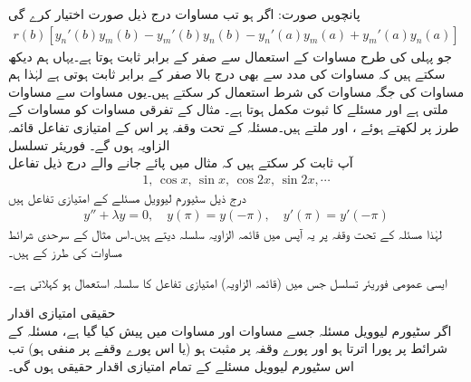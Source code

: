 پانچویں صورت: اگر  ہو تب مساوات   درج ذیل صورت اختیار کرے گی
\begin{align*}
r(b)[y_n'(b)y_m(b)-y_m'(b)y_n(b)-y_n'(a)y_m(a)+y_m'(a)y_n(a)]
\end{align*}
جو پہلی کی طرح  مساوات  کے استعمال سے صفر کے برابر ثابت ہوتا ہے۔یہاں ہم دیکھ سکتے ہیں کہ مساوات  کی مدد سے بھی درج بالا صفر کے برابر ثابت ہوتی ہے لہٰذا ہم مساوات  کی جگہ مساوات  کی شرط استعمال کر سکتے ہیں۔یوں مساوات  سے مساوات  ملتی ہے اور مسئلے کا ثبوت مکمل ہوتا ہے۔
مثال  کے تفرقی مساوات کو مساوات  کے طرز پر لکھتے ہوئے ،  اور  ملتے ہیں۔مسئلہ  کے تحت وقفہ  پر اس کے امتیازی تفاعل قائمہ الزاویہ ہوں گے۔
\quad فوریئر تسلسل\\
آپ ثابت کر سکتے ہیں کہ مثال  میں پائے جانے والے درج ذیل تفاعل 
\begin{align*}
1,\, \cos x , \, \sin x,\, \cos 2x,\, \sin 2x, \cdots
\end{align*}
درج ذیل سٹیورم لیوویل مسئلے کے امتیازی تفاعل ہیں
\begin{align*}
y''+\lambda y=0, \quad y(\pi)=y(-\pi), \quad y'(\pi)=y'(-\pi)
\end{align*}
 لہٰذا مسئلہ  کے تحت وقفہ  پر  یہ آپس میں قائمہ الزاویہ سلسلہ دیتے ہیں۔اس مثال کے سرحدی شرائط مساوات  کی طرز کے ہیں۔

ایسی عمومی فوریئر تسلسل جس میں (قائمہ الزاویہ) امتیازی تفاعل کا سلسلہ استعمال ہو  کہلاتی ہے۔ 

\quad حقیقی امتیازی اقدار\\
اگر سٹیورم لیوویل مسئلہ  جسے مساوات  اور مساوات  میں پیش کیا گیا ہے، مسئلہ  کے شرائط پر پورا اترتا ہو اور پورے وقفہ  پر  مثبت ہو (یا اس پورے وقفے پر   منفی ہو) تب اس سٹیورم لیوویل مسئلے کے تمام امتیازی اقدار حقیقی ہوں گی۔

